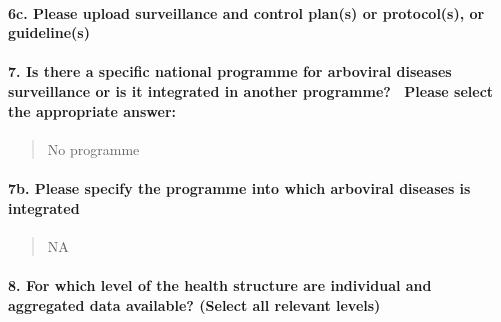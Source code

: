 \documentclass[
]{article}
\begin{document}
\begin{longtable}[]{@{}ll@{}}
\toprule
\endhead
\bottomrule
\end{longtable}

\hypertarget{c.-please-upload-surveillance-and-control-plans-or-protocols-or-guidelines}{%
\paragraph{6c. Please upload surveillance and control plan(s) or
protocol(s), or
guideline(s)}\label{c.-please-upload-surveillance-and-control-plans-or-protocols-or-guidelines}}

\begin{quote}
\end{quote}

\hypertarget{is-there-a-specific-national-programme-for-arboviral-diseases-surveillance-or-is-it-integrated-in-another-programme-please-select-the-appropriate-answer}{%
\paragraph{7. Is there a specific national programme for arboviral
diseases surveillance or is it integrated in another programme?~ Please
select the appropriate
answer:}\label{is-there-a-specific-national-programme-for-arboviral-diseases-surveillance-or-is-it-integrated-in-another-programme-please-select-the-appropriate-answer}}

\begin{quote}
No programme
\end{quote}

\hypertarget{b.-please-specify-the-programme-into-which-arboviral-diseases-is-integrated}{%
\paragraph{7b. Please specify the programme into which arboviral
diseases is
integrated}\label{b.-please-specify-the-programme-into-which-arboviral-diseases-is-integrated}}

\begin{quote}
NA
\end{quote}

\hypertarget{for-which-level-of-the-health-structure-are-individual-and-aggregated-data-available-select-all-relevant-levels}{%
\paragraph{8. For which level of the health structure are individual and
aggregated data available? (Select all relevant
levels)}\label{for-which-level-of-the-health-structure-are-individual-and-aggregated-data-available-select-all-relevant-levels}}
\end{document}
